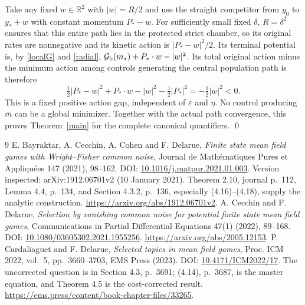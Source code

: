 \documentclass[11pt,a4paper]{article}
\newcommand{\R}{\mathbb R}
\newcommand{\G}{\mathcal G}
\begin{document}
Take any fixed $w\in\R^2$ with $|w|=R/2$ and use the straight
competitor from $y_0$ to $y_*+w$ with constant momentum $P_*-w$.
For sufficiently small fixed $\delta$, $R=\delta^2$ ensures that
this entire path lies in the protected strict chamber, so its original
rates are nonnegative and its kinetic action is $|P_*-w|^2/2$.
Its terminal potential is, by \eqref{localG} and \eqref{radial},
$\G_{\rm b}(m_*)+P_*\cdot w-|w|^2$.
Its total original action minus the minimum action among controls
generating the central population path is therefore
\[
 \tfrac12|P_*-w|^2+P_*\cdot w-|w|^2
                    -\tfrac12|P_*|^2=-\tfrac12|w|^2<0.
\]
This is a fixed positive action gap, independent of
$\varepsilon$ and $\eta$. No control producing $\bar m$ can be a
global minimizer. Together with the actual path convergence, this
proves Theorem~\ref{main} for the complete canonical quantifiers.
\qed

\begin{thebibliography}{9}
 E. Bayraktar, A. Cecchin, A. Cohen and F. Delarue,
\emph{Finite state mean field games with Wright--Fisher common noise},
Journal de Math\'ematiques Pures et Appliqu\'ees 147 (2021), 98--162.
DOI: \href{https://doi.org/10.1016/j.matpur.2021.01.003}{10.1016/j.matpur.2021.01.003}.
Version inspected: arXiv:1912.06701v2 (10 January 2021).
Theorem 2.10, journal p.~112, Lemma 4.4, p.~134, and Section 4.3.2,
p.~136, especially (4.16)--(4.18), supply the analytic construction.
\url{https://arxiv.org/abs/1912.06701v2}.
 A. Cecchin and F. Delarue,
\emph{Selection by vanishing common noise for potential finite state
mean field games}, Communications in Partial Differential Equations
47(1) (2022), 89--168.
DOI: \href{https://doi.org/10.1080/03605302.2021.1955256}{10.1080/03605302.2021.1955256}.
\url{https://arxiv.org/abs/2005.12153}.
 P. Cardaliaguet and F. Delarue,
\emph{Selected topics in mean field games}, Proc. ICM 2022, vol.~5,
pp.~3660--3703, EMS Press (2023).
DOI: \href{https://doi.org/10.4171/ICM2022/17}{10.4171/ICM2022/17}.
The uncorrected question is in Section 4.3, p.~3691; (4.14), p.~3687,
is the master equation, and Theorem 4.5 is the cost-corrected result.
\url{https://ems.press/content/book-chapter-files/33265}.
\end{thebibliography}
\end{document}
